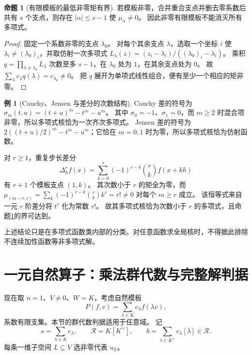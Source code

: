 \documentclass[UTF8,11pt,a4paper]{ctexart}
\theoremstyle{definition}
\newtheorem{proposition}[theorem]{命题}
\newtheorem{example}[theorem]{例}
\begin{document}
\begin{proposition}[有限模板的最低非零矩有界]\label{prop:momentbound}
若模板非零，合并重合支点并删去零系数后共有 $s$ 个支点，则存在 $|\alpha|\le s-1$ 使 $\mu_\alpha\ne0$。
因此非零有限模板不能消灭所有多项式。
\end{proposition}
\begin{proof}
固定一个系数非零的支点 $\lambda_0$。
对每个其余支点 $\lambda$，选取一个坐标 $i$ 使 $\lambda_i\ne(\lambda_0)_i$，并取仿射一次多项式
$L_\lambda(z)=(z_i-\lambda_i)/((\lambda_0)_i-\lambda_i)$。
乘积 $q=\prod_{\lambda\ne\lambda_0}L_\lambda$ 次数至多 $s-1$，在 $\lambda_0$ 处为 $1$，在其余支点处为 $0$。
故 $\sum_\lambda c_\lambda q(\lambda)=c_{\lambda_0}\ne0$。
把 $q$ 展开为单项式线性组合，便有至少一个相应的矩非零。
\end{proof}

\begin{example}[Cauchy、Jensen 与差分的次数结构]
Cauchy 差的符号为 $\sigma_m(t,u)=(t+u)^m-t^m-u^m$。
其中 $\sigma_0=-1$、$\sigma_1=0$，而 $m\ge2$ 时混合项非零，所以多项式核恰为一次齐次多项式。
Jensen 差的符号为 $2((t+u)/2)^m-t^m-u^m$；它恰在 $m=0,1$ 时为零，所以多项式核恰为仿射函数。

对 $r\ge1$，重复步长差分
\[
 \Delta_h^r f(x)=\sum_{k=0}^r(-1)^{r-k}\binom rk f(x+kh)
\]
有 $r+1$ 个模板支点 $(1,k)$。
其次数小于 $r$ 的矩全为零，而
$\mu_{(m-r,r)}=\sum_k(-1)^{r-k}\binom rk k^r=r!\ne0$ 对每个 $m\ge r$ 成立。
该恒等式来自一元 $r$ 阶差分将 $t^r$ 化为常数 $r!$。
故其多项式核恰为次数小于 $r$ 的多项式，且命题\ref{prop:momentbound}的界可达到。
\end{example}
上述结论只是在多项式函数类内部的分类。对任意函数求全局核时，不得据此排除不连续加性函数等非多项式解。

\section{一元自然算子：乘法群代数与完整解判据}\label{sec:dilation}
现在取 $n=1$、$V\ne0$、$W=K$，考虑自然模板
\begin{equation}\label{eq:dilation}
 P(f,v)=\sum_{\lambda\in K}c_\lambda f(\lambda v),
\end{equation}
系数有限支集。本节的群代数判据适用于任意域。
记
\[
 s=\sum_{\lambda\in K}c_\lambda,\qquad
 \mathcal R=K[K^\times],\qquad
 b=\sum_{\lambda\in K^\times}c_\lambda[\lambda]\in\mathcal R.
\]
每条一维子空间 $L\subseteq V$ 选非零代表 $u_L$。
\end{document}

